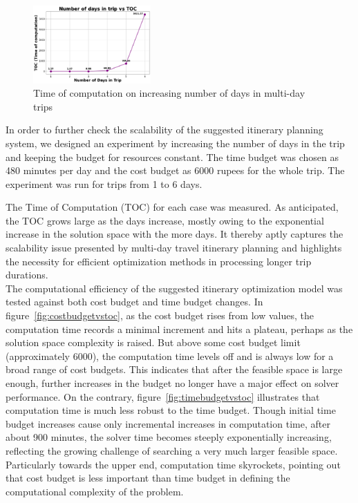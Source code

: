 \begin{figure}[H]
    \includegraphics[width=0.4\textwidth]{plots/multidayvstoc.png}
     \caption{Time of computation on increasing number of days in multi-day trips}
    \label{fig:scalability2}
\end{figure}

In order to further check the scalability of the suggested itinerary planning system, we designed an experiment by increasing the number of days in the trip and keeping the budget for resources constant. The time budget was chosen as 480 minutes per day and the cost budget as 6000 rupees for the whole trip. The experiment was run for trips from 1 to 6 days.

The Time of Computation (TOC) for each case was measured. As anticipated, the TOC grows large as the days increase, mostly owing to the exponential increase in the solution space with the more days. It thereby aptly captures the scalability issue presented by multi-day travel itinerary planning and highlights the necessity for efficient optimization methods in processing longer trip durations.\\

\noindent The computational efficiency of the suggested itinerary optimization model was tested against both cost budget and time budget changes. In figure~\ref{fig:costbudgetvstoc}, as the cost budget rises from low values, the computation time records a minimal increment and hits a plateau, perhaps as the solution space complexity is raised. But above some cost budget limit (approximately 6000), the computation time levels off and is always low for a broad range of cost budgets. This indicates that after the feasible space is large enough, further increases in the budget no longer have a major effect on solver performance. On the contrary, figure~\ref{fig:timebudgetvstoc} illustrates that computation time is much less robust to the time budget. Though initial time budget increases cause only incremental increases in computation time, after about 900 minutes, the solver time becomes steeply exponentially increasing, reflecting the growing challenge of searching a very much larger feasible space. Particularly towards the upper end, computation time skyrockets, pointing out that cost budget is less important than time budget in defining the computational complexity of the problem.
